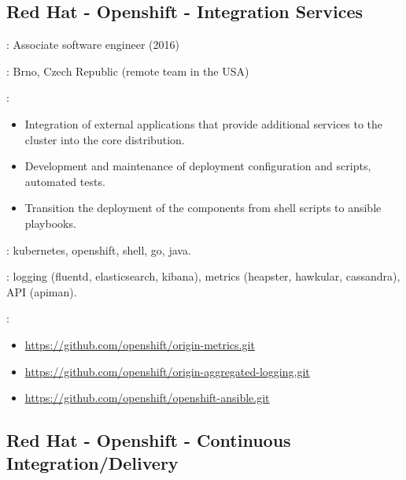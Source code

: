 \subsection*{Red Hat - Openshift - Integration Services}

\begin{description}[noitemsep]
    \item[Title]: Associate software engineer (2016)
    \item[Location]: Brno, Czech Republic (remote team in the USA)
    \item[Attributions]:
        \begin{itemize}[noitemsep]
            \item
                Integration of external applications that provide additional
                services to the cluster into the core distribution.
            \item
                Development and maintenance of deployment configuration and
                scripts, automated tests.
            \item
                Transition the deployment of the components from shell scripts
                to ansible playbooks.
        \end{itemize}
    \item[Platform]: kubernetes, openshift, shell, go, java.
    \item[Services]:
        logging (fluentd, elasticsearch, kibana), metrics (heapster, hawkular,
        cassandra), API (apiman).
    \item[Public repositories]:
        \begin{itemize}[noitemsep]
            \item \url{https://github.com/openshift/origin-metrics.git}
            \item \url{https://github.com/openshift/origin-aggregated-logging.git}
            \item \url{https://github.com/openshift/openshift-ansible.git}
        \end{itemize}
\end{description}

\subsection*{Red Hat - Openshift - Continuous Integration/Delivery}

